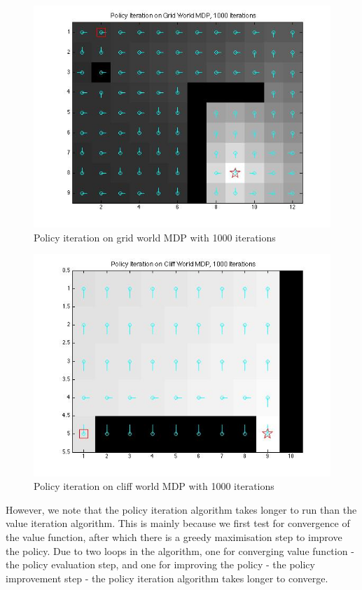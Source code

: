 \documentclass{article}\usepackage[]{graphicx}\usepackage[]{color}
\theoremstyle{plain}
\begin{document}
\begin{figure}[h!]
  \includegraphics[scale=0.5]{policy1000_grid.jpg}
  \caption{Policy iteration on grid world MDP with 1000 iterations}
  \label{figure9}
\end{figure}


\begin{figure}[h!]
  \includegraphics[scale=0.5]{policy1000_cliff.jpg}
  \caption{Policy iteration on cliff world MDP with 1000 iterations}
  \label{figure10}
\end{figure}





\noindent
However, we note that the policy iteration algorithm takes longer to run than the value iteration algorithm. This is mainly because we first test for convergence of the value function, after which there is a greedy maximisation step to improve the policy. Due to two loops in the algorithm, one for converging value function - the policy evaluation step, and one for improving the policy - the policy improvement step - the policy iteration algorithm takes longer to converge. 
\end{document}
